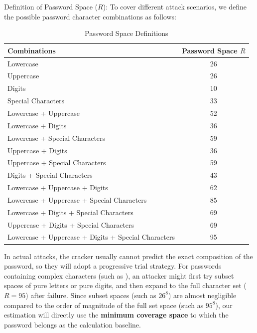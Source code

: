 \documentclass[12pt,a4paper]{article}
\begin{document}
Definition of Password Space ($R$): To cover different attack scenarios, we define the possible password character combinations as follows:

\begin{table}[h!]
\centering
\caption{Password Space Definitions}
\label{tab:password_space}
\begin{tabularx}{\textwidth}{@{} X c @{}}
\toprule
\textbf{Combinations} & \textbf{Password Space $R$} \\
\midrule
Lowercase                                           & 26 \\
Uppercase                                           & 26 \\
Digits                                              & 10 \\
Special Characters                                  & 33 \\
Lowercase + Uppercase                               & 52 \\
Lowercase + Digits                                  & 36 \\
Lowercase + Special Characters                      & 59 \\
Uppercase + Digits                                  & 36 \\
Uppercase + Special Characters                      & 59 \\
Digits + Special Characters                         & 43 \\
Lowercase + Uppercase + Digits                      & 62 \\
Lowercase + Uppercase + Special Characters          & 85 \\
Lowercase + Digits + Special Characters             & 69 \\
Uppercase + Digits + Special Characters             & 69 \\
Lowercase + Uppercase + Digits + Special Characters & 95 \\
\bottomrule
\end{tabularx}
\end{table}

In actual attacks, the cracker usually cannot predict the exact composition of the password, so they will adopt a progressive trial strategy. For passwords containing complex characters (such as ), an attacker might first try subset spaces of pure letters or pure digits, and then expand to the full character set ($R=95$) after failure. Since subset spaces (such as $26^8$) are almost negligible compared to the order of magnitude of the full set space (such as $95^8$), our estimation will directly use the \textbf{minimum coverage space} to which the password belongs as the calculation baseline.
\end{document}
